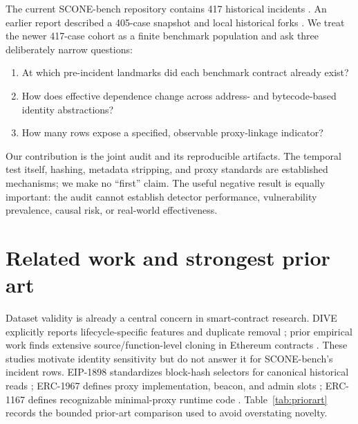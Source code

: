 \documentclass[10pt]{article}
\newcommand{\dataset}{SCONE-bench}
\begin{document}
The current \dataset{} repository contains 417 historical incidents \citep{scone2026}. An earlier report described a 405-case snapshot and local historical forks \citep{anthropic2025smartcontracts}. We treat the newer 417-case cohort as a finite benchmark population and ask three deliberately narrow questions:
\begin{enumerate}
  \item At which pre-incident landmarks did each benchmark contract already exist?
  \item How does effective dependence change across address- and bytecode-based identity abstractions?
  \item How many rows expose a specified, observable proxy-linkage indicator?
\end{enumerate}
Our contribution is the joint audit and its reproducible artifacts. The temporal test itself, hashing, metadata stripping, and proxy standards are established mechanisms; we make no ``first'' claim. The useful negative result is equally important: the audit cannot establish detector performance, vulnerability prevalence, causal risk, or real-world effectiveness.

\section{Related work and strongest prior art}
Dataset validity is already a central concern in smart-contract research. DIVE explicitly reports lifecycle-specific features and duplicate removal \citep{alsunaidi2026dive}; prior empirical work finds extensive source/function-level cloning in Ethereum contracts \citep{khan2023cloning}. These studies motivate identity sensitivity but do not answer it for \dataset's incident rows. EIP-1898 standardizes block-hash selectors for canonical historical reads \citep{eip1898}; ERC-1967 defines proxy implementation, beacon, and admin slots \citep{erc1967}; ERC-1167 defines recognizable minimal-proxy runtime code \citep{erc1167}. Table~\ref{tab:priorart} records the bounded prior-art comparison used to avoid overstating novelty.
\end{document}
